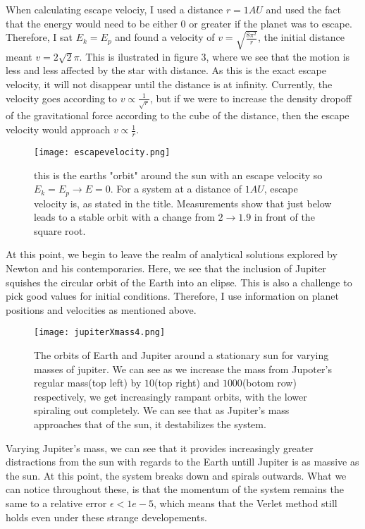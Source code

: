 \documentclass[10pt, twocolumn]{revtex4-1}
\begin{document}
When calculating escape velociy, I used a distance $r= 1AU$ and used the fact that the energy would need to be either $0$
or greater if the planet was to escape. Therefore, I sat $E_k = E_p$ and found a velocity of $v = \sqrt{\frac{8\pi^2}{r}}$,
the initial distance meant $v = 2\sqrt{2}\pi$. This is ilustrated in figure 3, where we see that the motion is less and 
less affected by the star with distance. As this is the exact escape velocity, it will not disappear until the distance is at 
infinity. Currently, the velocity goes according to $v \propto \frac{1}{\sqrt{r}}$, but if we were to increase the density
dropoff of the gravitational force according to the cube of the distance, then the escape velocity would approach 
$v \propto \frac{1}{r}$.
\begin{figure}[hbtp]
    \texttt{[image: escapevelocity.png]}
    \caption{this is the earths "orbit" around the sun with an escape velocity so $E_k = E_p \rightarrow E=0$.
        For a system at a distance of $1 AU$, escape velocity is, as stated in the title. Measurements show that 
        just below leads to a stable orbit with a change from $2 \rightarrow 1.9$ in front of the square root.} 
    \label{}
\end{figure}

At this point, we begin to leave the realm of analytical solutions explored by Newton and his contemporaries. Here, we see that 
the inclusion of Jupiter squishes the circular orbit of the Earth into an elipse. This is also a challenge to pick good values for 
initial conditions. Therefore, I use information on planet positions and velocities\cite{MathiasPlanetvalues} as mentioned above. 
\begin{figure}[hbtp]
    \texttt{[image: jupiterXmass4.png]}
    \caption{The orbits of Earth and Jupiter around a stationary sun for varying masses of jupiter. We can see 
    as we increase the mass from Jupoter's regular mass(top left) by $10$(top right) and $1 000$(botom row) 
    respectively, we get increasingly rampant orbits, with the lower spiraling out completely. We can see that as
    Jupiter's mass approaches that of the sun, it destabilizes the system. }
    \label{}
\end{figure}
Varying Jupiter's mass, we can see that it provides increasingly greater distractions from the sun with regards to the Earth untill
Jupiter is as massive as the sun. At this point, the system breaks down and spirals outwards. What we can notice throughout these, is
that the momentum of the system remains the same to a relative error $\epsilon < 1e-5$, which means that the Verlet method still holds 
even under these strange developements. 
\end{document}
